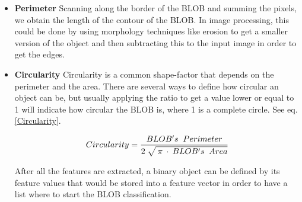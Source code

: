 {\begin{itemize}
\item \textbf{Perimeter}
Scanning along the border of the BLOB and summing the pixels, we obtain the length of the contour of the BLOB. In image processing, this could be done by using morphology techniques like erosion to get a smaller version of the object and then subtracting this to the input image in order to get the edges.
\item \textbf{Circularity}
Circularity is a common shape-factor that depends on the perimeter and the area. There are several ways to define how circular an object can be, but usually applying the ratio to get a value lower or equal to 1 will indicate how circular the BLOB is, where 1 is a complete circle. See eq. \ref{Circularity}.


\begin{equation}	
	\begin{aligned}
	{Circularity}=\displaystyle\frac{BLOB's \;\; Perimeter}{2 \; \sqrt{\mathstrut \: \pi \: \cdot \: {BLOB's \;\; Area}}}
	\label{Circularity}
	\end{aligned}
\end{equation}


After all the features are extracted, a binary object can be defined by its feature values that would be stored into a feature vector in order to have a list where to start the BLOB classification.
\end{itemize}


}
